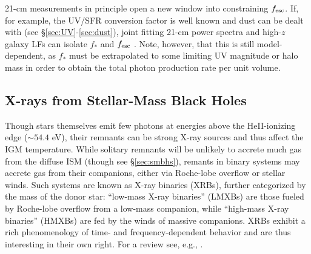 21-cm measurements in principle open a new window into constraining $f_{\text{esc}}$. If, for example, the UV/SFR conversion factor is well known and dust can be dealt with (see \S\ref{sec:UV}-\ref{sec:dust}), joint fitting 21-cm power spectra and high-$z$ galaxy LFs can isolate $f_{\ast}$ and $f_{\text{esc}}$ \cite{Park2019,Greig2019}. Note, however, that this is still model-dependent, as $f_{\ast}$ must be extrapolated to some limiting UV magnitude or halo mass in order to obtain the total photon production rate per unit volume. 

\subsection{X-rays from Stellar-Mass Black Holes} \label{sec:hmxbs}
Though stars themselves emit few photons at energies above the HeII-ionizing edge ($\sim 54.4$ eV), their remnants can be strong X-ray sources and thus affect the IGM temperature. While solitary remnants will be unlikely to accrete much gas from the diffuse ISM (though see \S\ref{sec:smbhs}), remants in binary systems may accrete gas from their companions, either via Roche-lobe overflow or stellar winds. Such systems are known as X-ray binaries (XRBs), further categorized by the mass of the donor star: ``low-mass X-ray binaries'' (LMXBs) are those fueled by Roche-lobe overflow from a low-mass companion, while ``high-mass X-ray binaries'' (HMXBs) are fed by the winds of massive companions. XRBs exhibit a rich phenomenology of time- and frequency-dependent behavior and are thus interesting in their own right. For a review see, e.g., \cite{Remillard2006}.

